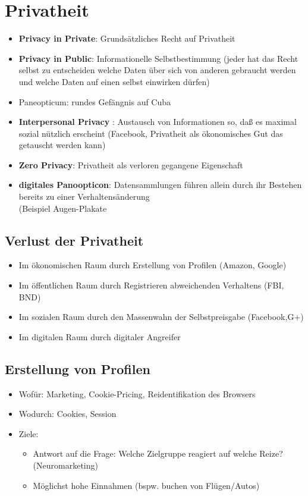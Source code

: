 \documentclass{article} %
\begin{document}
\section{Privatheit}
	\begin{itemize}
		\item \glqq \textbf{Privacy in Private}\grqq: Grundsätzliches Recht auf Privatheit
		\item \glqq \textbf{Privacy in Public}\grqq: Informationelle Selbstbestimmung (jeder hat das Recht selbst zu entscheiden welche Daten über sich von anderen gebraucht werden und welche Daten auf einen selbst einwirken dürfen)
		\item Paneopticum: rundes Gefängnis auf Cuba
		\item \glqq \textbf{Interpersonal Privacy} \grqq: Austausch von Informationen so, daß es maximal sozial nützlich
		erscheint (Facebook, Privatheit als ökonomisches Gut das getauscht werden kann)
		\item \glqq \textbf{Zero Privacy}\grqq: Privatheit als verloren gegangene Eigenschaft
		\item \textbf{digitales Panoopticon}: Datensammlungen führen allein durch ihr Bestehen bereits zu einer Verhaltensänderung\\
		(Beispiel Augen-Plakate
	\end{itemize}
	\subsection{Verlust der Privatheit}
	\begin{itemize}
			\item Im ökonomischen Raum durch Erstellung von Profilen (Amazon, Google)
			\item Im öffentlichen Raum durch Registrieren abweichenden Verhaltens (FBI, BND)
			\item Im sozialen Raum durch den Massenwahn der Selbstpreisgabe (Facebook,G+)
			\item Im digitalen Raum durch digitaler Angreifer
	\end{itemize}
		\subsection{Erstellung von Profilen}
	\begin{itemize}
		\item Wofür: Marketing, Cookie-Pricing, Reidentifikation des Browsers
		\item Wodurch: Cookies, Session
		\item Ziele:
		\begin{itemize}
			\item Antwort auf die Frage: \glqq Welche Zielgruppe reagiert auf welche Reize?\grqq (Neuromarketing)
			\item Möglichst hohe Einnahmen (bspw. buchen von Flügen/Autos)
		\end{itemize}
	\end{itemize}
\end{document}
